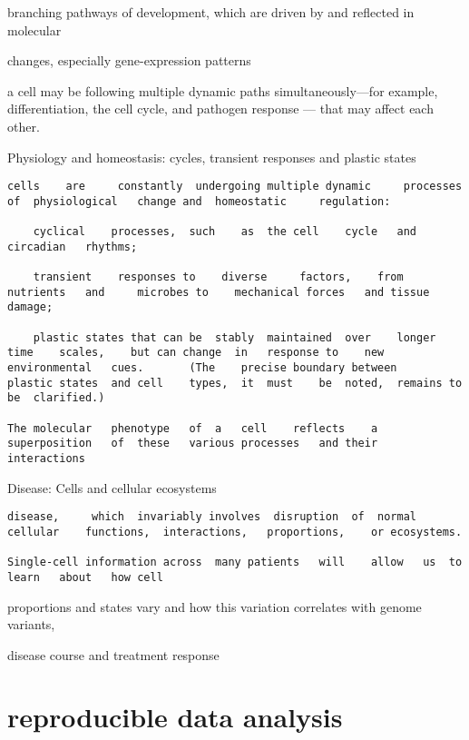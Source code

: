 \documentclass[
]{book}
\begin{document}
branching pathways of development, which are driven by and reflected in molecular

changes, especially gene-expression patterns

a cell may be following multiple dynamic paths simultaneously---for example, differentiation, the cell cycle, and pathogen response --- that may affect each other.

Physiology and homeostasis: cycles, transient responses and plastic states

\begin{verbatim}
cells    are     constantly  undergoing multiple dynamic     processes   of  physiological   change and  homeostatic     regulation:

    cyclical    processes,  such    as  the cell    cycle   and circadian   rhythms;

    transient    responses to    diverse     factors,    from    nutrients   and     microbes to    mechanical forces   and tissue  damage; 

    plastic states that can be  stably  maintained  over    longer   time    scales,    but can change  in   response to    new environmental   cues.       (The    precise boundary between    plastic states  and cell    types,  it  must    be  noted,  remains to  be  clarified.)

The molecular   phenotype   of  a   cell    reflects    a   superposition   of  these   various processes   and their   interactions
\end{verbatim}

Disease: Cells and cellular ecosystems

\begin{verbatim}
disease,     which  invariably involves  disruption  of  normal  cellular    functions,  interactions,   proportions,    or ecosystems. 

Single-cell information across  many patients   will    allow   us  to  learn   about   how cell    
\end{verbatim}

proportions and states vary and how this variation correlates with genome variants,

disease course and treatment response

\hypertarget{reproducible-data-analysis}{%
\section{reproducible data analysis}\label{reproducible-data-analysis}}
\end{document}
